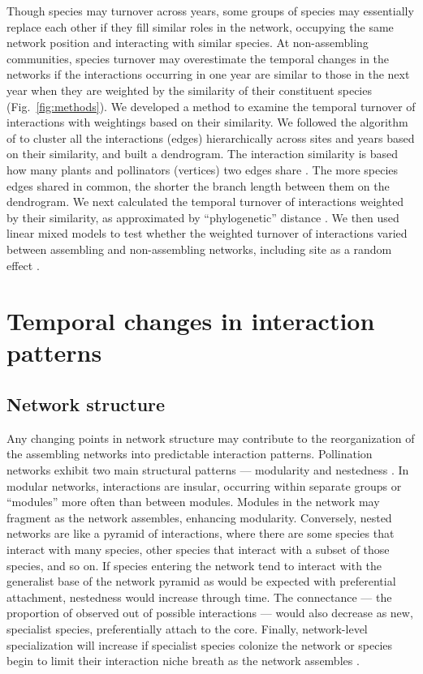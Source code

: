 \documentclass[12pt]{article}
\begin{document}
Though species may turnover across years, some groups of species may
essentially replace each other if they fill similar roles in the
network, occupying the same network position and interacting with
similar species. At non-assembling communities, species turnover may
overestimate the temporal changes in the networks if the interactions
occurring in one year are similar to those in the next year when they
are weighted by the similarity of their constituent species
(Fig.~\ref{fig:methods}). We developed a method to examine the
temporal turnover of interactions with weightings based on their
similarity. We followed the algorithm of \cite{ahn2010link} to cluster
all the interactions (edges) hierarchically across sites and years
based on their similarity, and built a dendrogram. The interaction
similarity is based how many plants and pollinators (vertices) two
edges share \citep{ahn2010link, kalinka2011linkcomm}. The more species
edges shared in common, the shorter the branch length between them on
the dendrogram.  We next calculated the temporal turnover of
interactions weighted by their similarity, as approximated by
``phylogenetic'' distance \citep{graham2008phylogenetic,
  picante-2010-1463}. We then used linear mixed models to test whether
the weighted turnover of interactions varied between assembling and
non-assembling networks, including site as a random effect
\citep{lme4, lmetest}.

\section*{Temporal changes in interaction patterns}

\subsection*{Network structure}
Any changing points in network structure may contribute to the
reorganization of the assembling networks into predictable interaction
patterns. Pollination networks exhibit two main structural patterns
--- modularity \citep[e.g.,][]{Olesen2007} and nestedness
\citep[e.g.,][]{Bascompte2006, Bascompte2003}. In modular networks,
interactions are insular, occurring within separate groups or
``modules'' more often than between modules. Modules in the network
may fragment as the network assembles, enhancing
modularity. Conversely, nested networks are like a pyramid of
interactions, where there are some species that interact with many
species, other species that interact with a subset of those species,
and so on. If species entering the network tend to interact with the
generalist base of the network pyramid as would be expected with
preferential attachment, nestedness would increase through time. The
connectance --- the proportion of observed out of possible
interactions --- would also decrease as new, specialist species,
preferentially attach to the core. Finally, network-level
specialization will increase if specialist species colonize the
network or species begin to limit their interaction niche breath as
the network assembles \citep{bluthgen-2006-9}.
\end{document}

